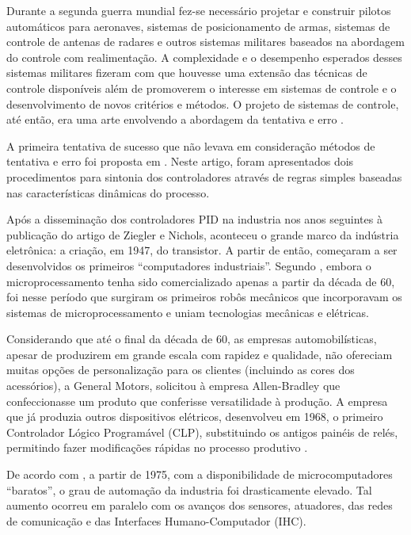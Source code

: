 Durante a segunda guerra mundial fez-se necessário projetar e construir pilotos
automáticos para aeronaves, sistemas de posicionamento de armas, sistemas de
controle de antenas de radares e outros sistemas militares baseados na abordagem
do controle com realimentação. A complexidade e o desempenho esperados desses
sistemas militares fizeram com que houvesse uma extensão das técnicas de
controle disponíveis além de promoverem o interesse em sistemas de controle e o
desenvolvimento de novos critérios e métodos. O projeto de sistemas de controle,
até então, era uma arte envolvendo a abordagem da tentativa e erro
\cite{dorf:2009}.

A primeira tentativa de sucesso que não levava em consideração métodos de
tentativa e erro foi proposta em . Neste artigo, foram
apresentados dois procedimentos para sintonia dos controladores através de
regras simples baseadas nas características dinâmicas do processo.

Após a disseminação dos controladores PID na industria nos anos seguintes à
publicação do artigo de Ziegler e Nichols, aconteceu o grande marco da indústria
eletrônica: a criação, em 1947, do transistor. A partir de então, começaram a
ser desenvolvidos os primeiros ``computadores industriais''. Segundo
, embora o microprocessamento tenha sido comercializado
apenas a partir da década de 60, foi nesse período que surgiram os primeiros
robôs mecânicos que incorporavam os sistemas de microprocessamento e uniam
tecnologias mecânicas e elétricas.

Considerando que até o final da década de 60, as empresas automobilísticas,
apesar de produzirem em grande escala com rapidez e qualidade, não ofereciam
muitas opções de personalização para os clientes (incluindo as cores dos
acessórios), a General Motors, solicitou à empresa Allen-Bradley que
confeccionasse um produto que conferisse versatilidade à produção. A empresa que
já produzia outros dispositivos elétricos, desenvolveu em 1968, o primeiro
Controlador Lógico Programável (CLP), substituindo os antigos painéis de relés,
permitindo fazer modificações rápidas no processo produtivo \cite{goeking:2010}.


De acordo com , a partir de 1975, com a
disponibilidade de microcomputadores ``baratos'', o grau de automação da
industria foi drasticamente elevado. Tal aumento ocorreu em paralelo com os
avanços dos sensores, atuadores, das redes de comunicação e das Interfaces
Humano-Computador (IHC).

